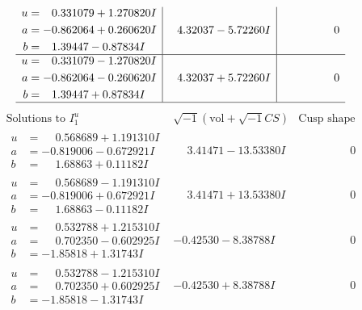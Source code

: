 \documentclass[1p]{elsarticle_modified}
\theoremstyle{definition}
\newcommand{\I}{\sqrt{-1}}
\begin{document}
$$\begin{array}{c|c|c}
\begin{aligned}
u &= \phantom{-}0.331079 + 1.270820 I \\
a &= -0.862064 + 0.260620 I \\
b &= \phantom{-}1.39447 - 0.87834 I\end{aligned}
 & \phantom{-}4.32037 - 5.72260 I & \phantom{-0.000000 } 0 \\ \hline\begin{aligned}
u &= \phantom{-}0.331079 - 1.270820 I \\
a &= -0.862064 - 0.260620 I \\
b &= \phantom{-}1.39447 + 0.87834 I\end{aligned}
 & \phantom{-}4.32037 + 5.72260 I & \phantom{-0.000000 } 0\\
 \hline 
 \end{array}$$\newpage$$\begin{array}{c|c|c}  
\text{Solutions to }I^u_{1}& \I (\text{vol} + \sqrt{-1}CS) & \text{Cusp shape}\\
 \hline 
\begin{aligned}
u &= \phantom{-}0.568689 + 1.191310 I \\
a &= -0.819006 - 0.672921 I \\
b &= \phantom{-}1.68863 + 0.11182 I\end{aligned}
 & \phantom{-}3.41471 - 13.53380 I & \phantom{-0.000000 } 0 \\ \hline\begin{aligned}
u &= \phantom{-}0.568689 - 1.191310 I \\
a &= -0.819006 + 0.672921 I \\
b &= \phantom{-}1.68863 - 0.11182 I\end{aligned}
 & \phantom{-}3.41471 + 13.53380 I & \phantom{-0.000000 } 0 \\ \hline\begin{aligned}
u &= \phantom{-}0.532788 + 1.215310 I \\
a &= \phantom{-}0.702350 - 0.602925 I \\
b &= -1.85818 + 1.31743 I\end{aligned}
 & -0.42530 - 8.38788 I & \phantom{-0.000000 } 0 \\ \hline\begin{aligned}
u &= \phantom{-}0.532788 - 1.215310 I \\
a &= \phantom{-}0.702350 + 0.602925 I \\
b &= -1.85818 - 1.31743 I\end{aligned}
 & -0.42530 + 8.38788 I & \phantom{-0.000000 } 0 \\ \hline\begin{aligned}

\end{aligned}
\end{array}$$
\end{document}
